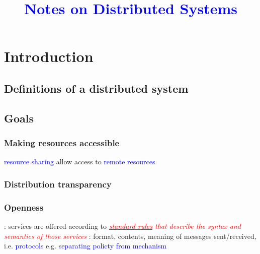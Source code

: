 \documentclass{myproc}
\begin{document}
\small
\title{\large\bf{}\textcolor{blue}{Notes on Distributed Systems}}
\author{}
\date{}
\maketitle

\section{Introduction}
\subsection{Definitions of a distributed system}
\subsection{Goals} 
\subsubsection{Making resources accessible}
\bit
\w \textcolor{blue}{resource sharing}
\w allow access to \textcolor{blue}{remote resources}
\eit
\subsubsection{Distribution transparency}
\bit
\w {}
\w {}
\w {}
\w {}
\w {}
\w {}
\w {}
\eit

\subsubsection{Openness}
\bit
\w {}: services are offered
according to \textcolor{red}{\textit{\underline{standard rules} that describe
    the syntax and semantics of those services}}
\w {}: format, contents, meaning of messages sent/received,
i.e. \textcolor{blue}{protocols}
\w e.g. 
\w \textcolor{blue}{separating policty from mechanism}
\eit
\end{document}
